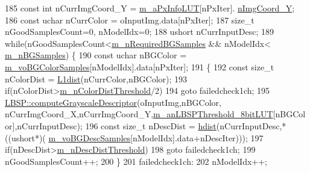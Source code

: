 \begin{DoxyCode}
185             \textcolor{keyword}{const} \textcolor{keywordtype}{int} nCurrImgCoord\_Y = \mbox{\hyperlink{class_background_subtractor_l_b_s_p_a74e73d4832ccdef652d93756582024db}{m\_aPxInfoLUT}}[nPxIter].
      \mbox{\hyperlink{struct_background_subtractor_l_b_s_p_1_1_px_info_base_a42cb6eecda647b2a11b90ea420f2bc31}{nImgCoord\_Y}};
186             \textcolor{keyword}{const} uchar nCurrColor = oInputImg.data[nPxIter];
187             \textcolor{keywordtype}{size\_t} nGoodSamplesCount=0, nModelIdx=0;
188             ushort nCurrInputDesc;
189             \textcolor{keywordflow}{while}(nGoodSamplesCount<\mbox{\hyperlink{class_background_subtractor_l_o_b_s_t_e_r_acb558aefc1b6205a63c1906b6fd1eeff}{m\_nRequiredBGSamples}} && nModelIdx<
      \mbox{\hyperlink{class_background_subtractor_l_o_b_s_t_e_r_a20c53540b952d608d849a305fd5eed89}{m\_nBGSamples}}) \{
190                 \textcolor{keyword}{const} uchar nBGColor = \mbox{\hyperlink{class_background_subtractor_l_o_b_s_t_e_r_ac981b39f8ae7b28d3e4326d8e6be6332}{m\_voBGColorSamples}}[nModelIdx].data[nPxIter];
191                 \{
192                     \textcolor{keyword}{const} \textcolor{keywordtype}{size\_t} nColorDist = \mbox{\hyperlink{_distance_utils_8h_ab6ec458f6d3fb6fb4e6cda3808e61703}{L1dist}}(nCurrColor,nBGColor);
193                     \textcolor{keywordflow}{if}(nColorDist>\mbox{\hyperlink{class_background_subtractor_l_o_b_s_t_e_r_a37a37a0a46fc8e33d954c33c1318d7b2}{m\_nColorDistThreshold}}/2)
194                         \textcolor{keywordflow}{goto} failedcheck1ch;
195                     \mbox{\hyperlink{class_l_b_s_p_a4a5f635868b6b81ba53df2692ee3dfd8}{LBSP::computeGrayscaleDescriptor}}(oInputImg,nBGColor,
      nCurrImgCoord\_X,nCurrImgCoord\_Y,\mbox{\hyperlink{class_background_subtractor_l_b_s_p_aefe69d94f08b2c4ba73ad1d254ad9153}{m\_anLBSPThreshold\_8bitLUT}}[nBGColor],nCurrInputDesc);
196                     \textcolor{keyword}{const} \textcolor{keywordtype}{size\_t} nDescDist = \mbox{\hyperlink{_distance_utils_8h_ab13812ef6e21af771d6c0a856cd941b0}{hdist}}(nCurrInputDesc,*((ushort*)(
      \mbox{\hyperlink{class_background_subtractor_l_o_b_s_t_e_r_a3c49866ae652423b2173215957907d04}{m\_voBGDescSamples}}[nModelIdx].data+nDescIter)));
197                     \textcolor{keywordflow}{if}(nDescDist>\mbox{\hyperlink{class_background_subtractor_l_o_b_s_t_e_r_abe3f4a836343e901746e4f243f5252e4}{m\_nDescDistThreshold}})
198                         \textcolor{keywordflow}{goto} failedcheck1ch;
199                     nGoodSamplesCount++;
200                 \}
201                 failedcheck1ch:
202                 nModelIdx++;

\end{DoxyCode}
